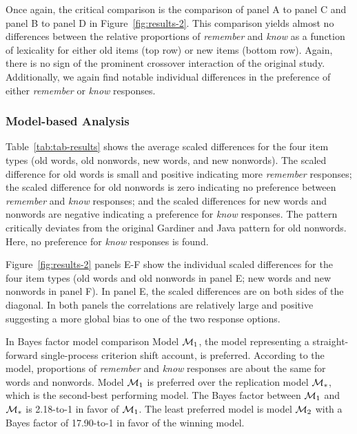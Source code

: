 \documentclass[english,,man]{apa6}
\begin{document}
Once again, the critical comparison is the comparison of panel A to panel C and panel B to panel D in Figure~\ref{fig:results-2}. This comparison yields almost no differences between the relative proportions of \emph{remember} and \emph{know} as a function of lexicality for either old items (top row) or new items (bottom row). Again, there is no sign of the prominent crossover interaction of the original study. Additionally, we again find notable individual differences in the preference of either \emph{remember} or \emph{know} responses.

\hypertarget{model-based-analysis-1}{%
\subsubsection{Model-based Analysis}\label{model-based-analysis-1}}

Table~\ref{tab:tab-results} shows the average scaled differences for the four item types (old words, old nonwords, new words, and new nonwords). The scaled difference for old words is small and positive indicating more \emph{remember} responses; the scaled difference for old nonwords is zero indicating no preference between \emph{remember} and \emph{know} responses; and the scaled differences for new words and nonwords are negative indicating a preference for \emph{know} responses. The pattern critically deviates from the original Gardiner and Java pattern for old nonwords. Here, no preference for \emph{know} responses is found.

Figure~\ref{fig:results-2} panels E-F show the individual scaled differences for the four item types (old words and old nonwords in panel E; new words and new nonwords in panel F). In panel E, the scaled differences are on both sides of the diagonal. In both panels the correlations are relatively large and positive suggesting a more global bias to one of the two response options.

In Bayes factor model comparison Model \({\cal M}_{1}\), the model representing a straight-forward single-process criterion shift account, is preferred. According to the model, proportions of \emph{remember} and \emph{know} responses are about the same for words and nonwords. Model \({\cal M}_{1}\) is preferred over the replication model \({\cal M}_{*}\), which is the second-best performing model. The Bayes factor between \({\cal M}_{1}\) and \({\cal M}_{*}\) is 2.18-to-1 in favor of \({\cal M}_{1}\). The least preferred model is model \({\cal M}_2\) with a Bayes factor of 17.90-to-1 in favor of the winning model.
\end{document}
